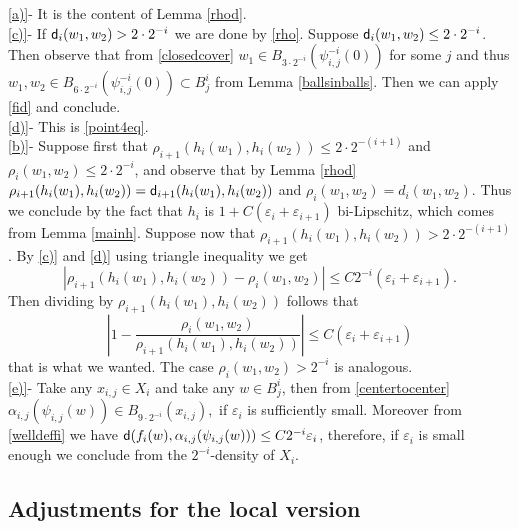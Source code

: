 \documentclass[11pt]{article}
\newcommand{\eps}{\varepsilon}
\newcommand{\sfd}{{\sf d}}
\theoremstyle{plain}
\theoremstyle{definition}
\numberwithin{equation}{section}
\begin{document}
\noindent \ref{a)}- It is the content of Lemma \ref{rhod}.\\
\ref{c)}- If $\sfd_i(w_1,w_2)>2\cdot 2^{-i}$ we are done by \eqref{rho}. Suppose  $\sfd_i(w_1,w_2)\le2\cdot 2^{-i}$. Then observe that from \eqref{closedcover}  $w_1 \in B_{3\cdot 2^{-i}}(\psi_{i,j}^{-i}(0))$ for some $j$ and thus $w_1,w_2 \in B_{6\cdot 2^{-i}}(\psi_{i,j}^{-i}(0))\subset B_j^i $ from Lemma \ref{ballsinballs}. Then we can apply  \eqref{fid} and conclude.\\
\ref{d)}- This is \ref{point4eq}.\\
\ref{b)}- Suppose first that $\rho_{i+1}(h_i(w_1),h_i(w_2))\le 2	\cdot 2^{-(i+1)}$ and $\rho_i(w_1,w_2)\le 2	\cdot 2^{-i}$, and observe that by Lemma \ref{rhod}  $\rho_{i+1}(h_i(w_1),h_i(w_2))=\sfd_{i+1}(h_{i}(w_1),h_i(w_2))$ and $\rho_i(w_1,w_2)=d_{i}(w_1,w_2)$. Thus we conclude by the fact that $h_i$ is $1+C(\eps_i+\eps_{i+1}) $ bi-Lipschitz, which comes from Lemma \ref{mainh}. Suppose now that  $\rho_{i+1}(h_i(w_1),h_i(w_2))>2	\cdot 2^{-(i+1)}$. By \ref{c)} and \ref{d)} using triangle inequality we get 
\[ |\rho_{i+1}(h_i(w_1),h_i(w_2))-\rho_i(w_1,w_2)|\le C2^{-i}(\eps_i+\eps_{i+1}).\]
Then dividing by $\rho_{i+1}(h_i(w_1),h_i(w_2))$ follows that
\[ \left |1-\frac{\rho_i(w_1,w_2)}{\rho_{i+1}(h_i(w_1),h_i(w_2))}\right|\le C(\eps_i+\eps_{i+1})\]
that is what we wanted. The case $\rho_i(w_1,w_2)>2^{-i}$ is analogous.\\
\ref{e)}- Take any $x_{i,j}\in X_i$ and take any $w \in B_j^i$, then from \eqref{centertocenter} $\alpha_{i,j}(\psi_{i,j}(w)) \in B_{9\cdot 2^{-i}}(x_{i,j}),$ if $\eps_i$ is sufficiently small. Moreover from \eqref{welldeffi} we have $\sfd(f_i(w),\alpha_{i,j}(\psi_{i,j}(w)))	\le C2^{-i}\eps_i$, therefore, if $\eps_i$ is small enough we conclude from the  $2^{-i}$-density of $ X_i$.



\subsection{Adjustments for the local version}\label{sec:local proof}
\end{document}
